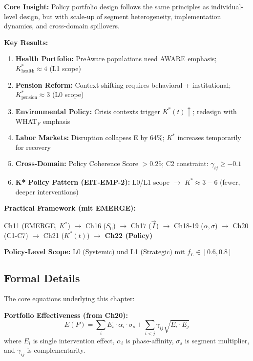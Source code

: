 \begin{tcolorbox}[
    colback=blue!5!white,
    colframe=blue!75!black,
    title={\textbf{Chapter 22 Summary: Policy Applications}}
]

\textbf{Core Insight:} Policy portfolio design follows the same principles as individual-level design, but with scale-up of segment heterogeneity, implementation dynamics, and cross-domain spillovers.

\textbf{Key Results:}
\begin{enumerate}[nosep]
    \item \textbf{Health Portfolio:} PreAware populations need AWARE emphasis; $K^*_{\text{health}} \approx 4$ (L1 scope)
    \item \textbf{Pension Reform:} Context-shifting requires behavioral + institutional; $K^*_{\text{pension}} \approx 3$ (L0 scope)
    \item \textbf{Environmental Policy:} Crisis contexts trigger $K^*(t) \uparrow$; redesign with WHAT$_F$ emphasis
    \item \textbf{Labor Markets:} Disruption collapses E by 64\%; $K^*$ increases temporarily for recovery
    \item \textbf{Cross-Domain:} Policy Coherence Score $> 0.25$; C2 constraint: $\gamma_{ij} \geq -0.1$
    \item \textbf{K* Policy Pattern (EIT-EMP-2):} L0/L1 scope $\to$ $K^* \approx 3-6$ (fewer, deeper interventions)
\end{enumerate}

\textbf{Practical Framework (mit EMERGE):}
\begin{center}
\small
Ch11 (EMERGE, $K^*$) $\rightarrow$ Ch16 ($S_0$) $\rightarrow$ Ch17 ($\vec{I}$) $\rightarrow$ Ch18-19 ($\alpha, \sigma$) $\rightarrow$ Ch20 (C1-C7) $\rightarrow$ Ch21 ($K^*(t)$) $\rightarrow$ \textbf{Ch22 (Policy)}
\end{center}

\textbf{Policy-Level Scope:} L0 (Systemic) und L1 (Strategic) mit $f_L \in [0.6, 0.8]$

\end{tcolorbox}

\subsection{Formal Details}
\label{sec:ch22-formal}

The core equations underlying this chapter:

\textbf{Portfolio Effectiveness (from Ch20):}
\begin{equation}
\label{eq:ch22-portfolio}
E(P) = \sum_{i} E_i \cdot \alpha_i \cdot \sigma_s + \sum_{i<j} \gamma_{ij} \sqrt{E_i \cdot E_j}
\end{equation}
where $E_i$ is single intervention effect, $\alpha_i$ is phase-affinity, $\sigma_s$ is segment multiplier, and $\gamma_{ij}$ is complementarity.

